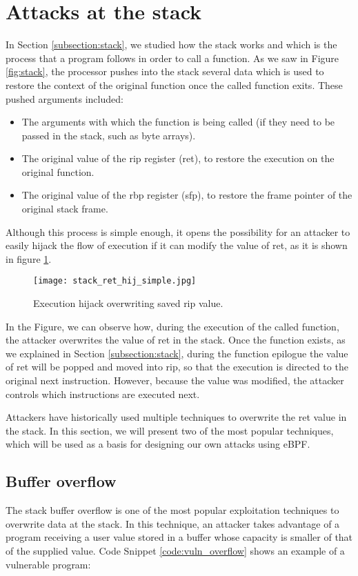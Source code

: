 \section{Attacks at the stack} \label{section:attacks_stack}
In Section \ref{subsection:stack}, we studied how the stack works and which is the process that a program follows in order to call a function. As we saw in Figure \ref{fig:stack}, the processor pushes into the stack several data which is used to restore the context of the original function once the called function exits. These pushed arguments included:
\begin{itemize}
\item The arguments with which the function is being called (if they need to be passed in the stack, such as byte arrays).
\item The original value of the rip register (ret), to restore the execution on the original function.
\item The original value of the rbp register (sfp), to restore the frame pointer of the original stack frame.
\end{itemize}

Although this process is simple enough, it opens the possibility for an attacker to easily hijack the flow of execution if it can modify the value of ret, as it is shown in figure \ref{fig:stack_ret_hij_simple}.
\begin{figure}[htbp]
	\centering
	\texttt{[image: stack\_ret\_hij\_simple.jpg]}
	\caption{Execution hijack overwriting saved rip value.}
	\label{fig:stack_ret_hij_simple}
\end{figure}

In the Figure, we can observe how, during the execution of the called function, the attacker overwrites the value of ret in the stack. Once the function exists, as we explained in Section \ref{subsection:stack}, during the function epilogue the value of ret will be popped and moved into rip, so that the execution is directed to the original next instruction. However, because the value was modified, the attacker controls which instructions are executed next.

Attackers have historically used multiple techniques to overwrite the ret value in the stack. In this section, we will present two of the most popular techniques, which will be used as a basis for designing our own attacks using eBPF.

\subsection{Buffer overflow} \label{subsection: buf_overflow}
The stack buffer overflow is one of the most popular exploitation techniques to overwrite data at the stack. In this technique, an attacker takes advantage of a program receiving a user value stored in a buffer whose capacity is smaller of that of the supplied value. Code Snippet \ref{code:vuln_overflow} shows an example of a vulnerable program:

